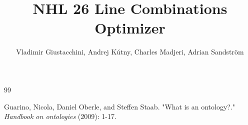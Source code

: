 \documentclass[11pt]{article}
\title{NHL 26 Line Combinations Optimizer}
\author{Vladimir Giustacchini, Andrej Kútny, Charles Madjeri, Adrian Sandström}
\begin{document}
\maketitle  %







\begin{thebibliography}{99}

Guarino, Nicola, Daniel Oberle, and Steffen Staab. "What is an ontology?." {\it Handbook on ontologies} (2009): 1-17.

\end{thebibliography}
\end{document}
